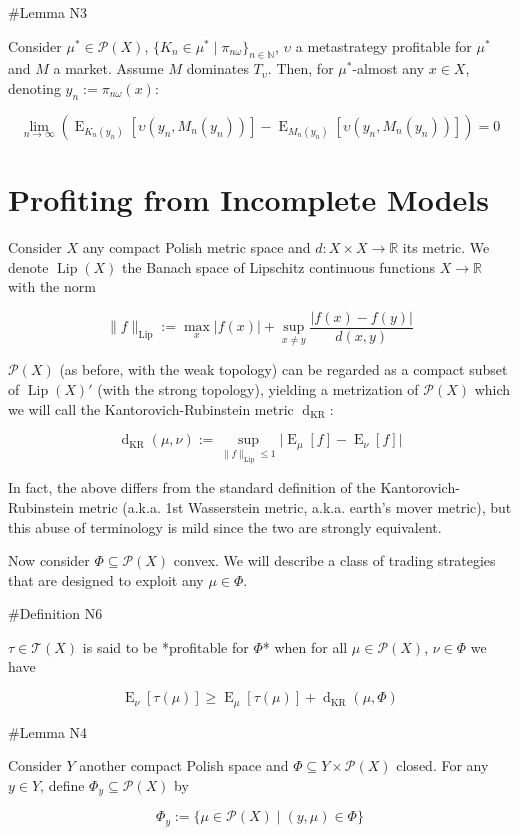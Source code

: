 \documentclass[a4paper]{article}
\DeclareMathOperator{\E}{E}
\newcommand{\Nats}{\mathbb{N}}
\newcommand{\Reals}{\mathbb{R}}
\newcommand{\Abs}[1]{\lvert #1 \rvert}
\newcommand{\Norm}[1]{\lVert #1 \rVert}
\newcommand{\Prob}{\mathcal{P}}
\newcommand{\T}{\mathcal{T}}
\newcommand{\Lip}{\operatorname{Lip}}
\newcommand{\NormL}[1]{\Norm{#1}_{\operatorname{Lip}}}
\newcommand{\Dkr}{\operatorname{d}_{\text{KR}}}
\begin{document}
\#Lemma N3

Consider ${\mu^* \in \Prob(X)}$, ${\{K_n \in \mu^* \mid \pi_{n\omega}\}_{n \in \Nats}}$, ${\upsilon}$ a metastrategy profitable for ${\mu^*}$ and ${M}$ a market. Assume ${M}$ dominates ${T_\upsilon}$. Then, for ${\mu^*}$-almost any ${x \in X}$, denoting ${y_n:=\pi_{n\omega}(x)}$:

$$\lim_{n \rightarrow \infty} (\E_{K_n(y_n)}[\upsilon(y_n,M_n(y_n))]-\E_{M_n(y_n)}[\upsilon(y_n,M_n(y_n))])= 0$$

\section{Profiting from Incomplete Models}

Consider ${X}$ any compact Polish metric space and ${d: X \times X \rightarrow \Reals}$ its metric. We denote ${\Lip(X)}$ the Banach space of Lipschitz continuous functions ${X \rightarrow \Reals}$ with the norm

$$\NormL{f}:=\max_{x} \Abs{f(x)} + \sup_{x \ne y}\frac{\Abs{f(x)-f(y)}}{d(x,y)}$$

${\Prob(X)}$ (as before, with the weak topology) can be regarded as a compact subset of ${\Lip(X)'}$ (with the strong topology), yielding a metrization of ${\Prob(X)}$ which we will call the Kantorovich-Rubinstein metric ${\Dkr}$:

$$\Dkr(\mu,\nu):=\sup_{\NormL{f} \leq 1} \Abs{\E_\mu[f] - \E_\nu[f]}$$

In fact, the above differs from the standard definition of the Kantorovich-Rubinstein metric (a.k.a. 1st Wasserstein metric, a.k.a. earth's mover metric), but this abuse of terminology is mild since the two are strongly equivalent.

Now consider ${\Phi \subseteq \Prob(X)}$ convex. We will describe a class of trading strategies that are designed to exploit any ${\mu \in \Phi}$.

\#Definition N6

${\tau \in \T(X)}$ is said to be *profitable for ${\Phi}$* when for all ${\mu \in \Prob(X)}$, ${\nu \in \Phi}$ we have

$$\E_\nu[\tau(\mu)] \geq \E_\mu[\tau(\mu)] + \Dkr(\mu,\Phi)$$

\#Lemma N4

Consider ${Y}$ another compact Polish space and ${\Phi \subseteq Y \times \Prob(X)}$ closed. For any ${y \in Y}$, define ${\Phi_y \subseteq \Prob(X)}$ by

$${\Phi_y := \{\mu \in \Prob(X) \mid (y,\mu) \in \Phi\}}$$ 
\end{document}
